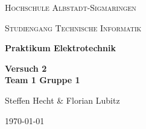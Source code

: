     \begin{titlepage}
        \centering
        {\scshape\LARGE Hochschule Albstadt-Sigmaringen \par}
        {\scshape\large Studiengang Technische Informatik \par}
        \vspace{3cm}
        {\LARGE\bfseries Praktikum Elektrotechnik\par}
        \vspace{2cm}
        {\Huge\bfseries Versuch 2 \\ Team 1 Gruppe 1\par}
        \vspace{1cm}
        {\Large Steffen Hecht \& Florian Lubitz\par}
        \vspace{2cm}
        \vfill

        {\large \today\par}
    \end{titlepage}